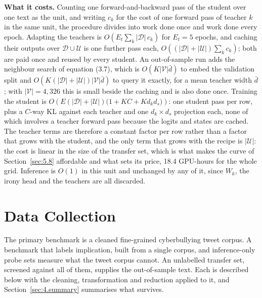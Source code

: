 \textbf{What it costs.} Counting one forward-and-backward pass of the student over one text as the
unit, and writing $c_k$ for the cost of one forward pass of teacher $k$ in the same unit, the
procedure divides into work done once and work done every epoch. Adapting the teachers is
$O\!\left(E_t \sum_k |\mathcal{D}|\, c_k\right)$ for $E_t = 5$ epochs, and caching their outputs over
$\mathcal{D} \cup \mathcal{U}$ is one further pass each, $O\!\left((|\mathcal{D}| + |\mathcal{U}|)
\sum_k c_k\right)$; both are paid once and reused by every student. An out-of-sample run adds the
neighbour search of equation (3.7), which is $O(K |\mathcal{V}| \bar d)$ to embed the validation split
and $O\!\left(K (|\mathcal{D}| + |\mathcal{U}|) |\mathcal{V}| \bar d\right)$ to query it exactly, for a
mean teacher width $\bar d$; with $|\mathcal{V}| = 4{,}326$ this is small beside the caching and is
also done once. Training the student is
$O\!\left(E (|\mathcal{D}| + |\mathcal{U}|)\big(1 + K C + K d_k d_s\big)\right)$: one student pass per
row, plus a $C$-way KL against each teacher and one $d_k \times d_s$ projection each, none of which
involves a teacher forward pass because the logits and states are cached. The teacher terms are
therefore a constant factor per row rather than a factor that grows with the student, and the only
term that grows with the recipe is $|\mathcal{U}|$: the cost is linear in the size of the transfer
set, which is what makes the curve of Section~\ref{sec:5.8} affordable and what sets its price, 18.4
GPU-hours for the whole grid. Inference is $O(1)$ in this unit and unchanged by any of it, since
$W_k$, the irony head and the teachers are all discarded.

\section{Data Collection}
\label{sec:4.data}
The primary benchmark is a cleaned fine-grained cyberbullying tweet corpus. A benchmark that labels
implication, built from a single corpus, and inference-only probe sets measure what the tweet corpus
cannot. An unlabelled transfer set, screened against all of them, supplies the out-of-sample text.
Each is described below with the cleaning, transformation and reduction applied to it, and
Section~\ref{sec:4.summary} summarises what survives.

